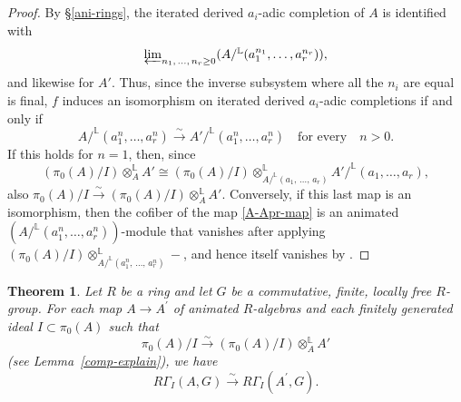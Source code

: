 \documentclass[11pt, reqno]{amsart}
\newcommand{\bL}{\mathbb{L}}
\newcommand{\isomto}{\overset{\sim}{\longrightarrow}}
\newcommand{\ra}{\rightarrow}
\newcommand{\tensor}{\otimes} 			%
\providecommand{\up}[1]{{\upshape(}#1{\upshape)}}
\providecommand{\uref}[1]{{\upshape\ref{#1}}}
\newcommand{\x}{\text}
\providecommand{\qxq}[1]{\quad\text{#1}\quad}
\newcommand{\q}{\quad}
\newcommand{\tst}{\textstyle}
\newcommand{\be}{\begin{equation}}
\newcommand{\ee}{\end{equation}}
\newcommand{\bpf}{\begin{proof}}
\newcommand{\epf}{\end{proof}}
\newcommand{\bthm}{\begin{thm}}
\newcommand{\ethm}{\end{thm}}
\numberwithin{equation}{numberingbase}
\theoremstyle{thms}
\newtheorem{thm}[numberingbase]{Theorem}
\theoremstyle{claims}
\theoremstyle{defs}
\theoremstyle{thms}
\theoremstyle{defs}
\theoremstyle{subsection-tweak}
\theoremstyle{subsection-tweak}
\begin{document}
\bpf
By \S\ref{ani-rings}, the iterated derived $a_i$-adic completion of $A$ is identified with 
\[
\tst \varprojlim_{n_1,\, \dotsc,\, n_r \ge 0} (A/^\bL(a_1^{n_1}, \dotsc, a_r^{n_r})),
\]
and likewise for $A'$. Thus, since the inverse subsystem where all the $n_i$ are equal is final, $f$ induces an isomorphism on iterated derived $a_i$-adic completions if and only if 
\be \label{A-Apr-map}
A/^\bL(a_1^n, \dotsc, a_r^n) \isomto A'/^\bL(a_1^n, \dotsc, a_r^n) \qxq{for every} n > 0.
\ee
If this holds for $n = 1$, then, since 
\[
\tst (\pi_0(A)/I) \tensor^\bL_A A' \cong (\pi_0(A)/I) \tensor^\bL_{A/^\bL(a_1,\, \dotsc,\, a_r)} A'/^\bL(a_1, \dotsc, a_r),
\] 
also $\pi_0(A)/I \isomto (\pi_0(A)/I) \tensor^\bL_A A'$. Conversely, if this last map is an isomorphism, then
the cofiber of the map \eqref{A-Apr-map} is an animated $(A/^\bL(a_1^n, \dotsc, a_r^n))$-module that vanishes after applying $(\pi_0(A)/I) \tensor^\bL_{A/^\bL(a_1^n,\, \dotsc,\, a_r^n)} -$, and hence  itself vanishes by .
\epf



\bthm\label{cor:excision} 
Let $R$ be a ring and let $G$ be a commutative, finite, locally free $R$-group. For each map $A\to A^\prime$ of animated $R$-algebras and each finitely generated ideal $I\subset \pi_0(A)$ such that 
\[
\pi_0(A)/I \isomto (\pi_0(A)/I)\otimes^\bL_A A'
\]
\up{see Lemma~\uref{comp-explain}}, we have
\[
R\Gamma_I(A, G) \isomto R\Gamma_{I}(A^\prime,G). %
\]
\ethm
\end{document}
